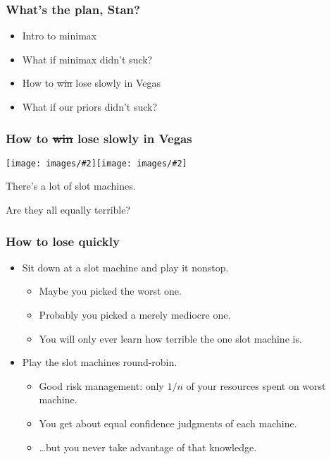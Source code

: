 \documentclass[table]{beamer}
\newcommand\img[2]{\texttt{[image: images/\#2]}}
\begin{document}
\begin{frame}
	\frametitle{What's the plan, Stan?}
	\begin{itemize}
		\setlength\itemsep{5ex}
		\item Intro to minimax
		\item What if minimax didn't suck?
		\item \alert{How to \sout{win} lose slowly in Vegas}
		\item What if our priors didn't suck?
	\end{itemize}
\end{frame}

\begin{frame}
	\frametitle{How to \sout{win} lose slowly in Vegas}
	\begin{center}
		\img{0.4}{slot-machine-choice-1.png}\hfil\img{0.4}{slot-machine-choice-2.png}

		\vspace{5ex}

		There's a lot of slot machines.

		Are they all equally terrible?
	\end{center}
\end{frame}

\begin{frame}
	\frametitle{How to lose quickly}
	\begin{itemize}
		\item Sit down at a slot machine and play it nonstop.
			\begin{itemize}
				\item Maybe you picked the worst one.
				\item Probably you picked a merely mediocre one.
				\item You will only ever learn how terrible the one slot
					machine is.
			\end{itemize}
		\item Play the slot machines round-robin.
			\begin{itemize}
				\item Good risk management: only $1/n$ of your resources
					spent on worst machine.
				\item You get about equal confidence judgments of each
					machine.
				\item \ldots{}but you never take advantage of that
					knowledge.
			\end{itemize}
	\end{itemize}
\end{frame}
\end{document}
